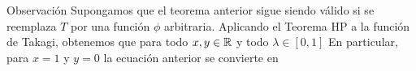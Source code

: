 \begin{frame}
	\begin{exampleblock}{Observación}
    	Supongamos que el teorema anterior sigue siendo válido si se reemplaza
    	$T$ por una función $\phi$ arbitraria.
    	Aplicando el Teorema HP a la función de Takagi, obtenemos
    	que para todo $x,y\in\mathbb{R}$ y todo $\lambda\in[0,1]$
    	En particular, para $x=1$ y $y=0$ la ecuación anterior se convierte en
    \end{exampleblock}
\end{frame}